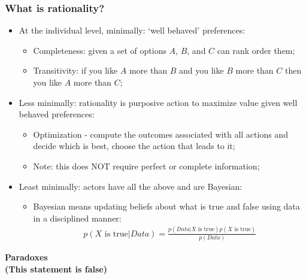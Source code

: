 \documentclass[aspectratio=169]{beamer}
\theoremstyle{principle}
\begin{document}
\begin{frame}
\frametitle{What is rationality?}

\begin{itemize}
\item At the individual level, minimally: `well behaved' preferences:
\begin{itemize}
\item Completeness: given a set of options $A$, $B$, and $C$ can rank order them;
\item Transitivity: if you like $A$ more than $B$ and you like $B$ more than $C$ then you like $A$ more than $C$;
\end{itemize}
\bigskip
\item Less minimally: rationality is purposive action to maximize value given well behaved preferences:
\begin{itemize}
\item Optimization - compute the outcomes associated with all actions and decide which is best, choose the action that leads to it;
\item Note: this does NOT require perfect or complete information;
\end{itemize}
\bigskip
\item Least minimally: actors have all the above and are Bayesian:
\begin{itemize}
\item Bayesian means updating beliefs about what is true and false using data in a disciplined manner:
\begin{align*}
p(X\mbox{ is true}|Data) = \frac{p(Data|X\mbox{ is true})p(X\mbox{ is true})}{p(Data)}
\end{align*}
\end{itemize}
\end{itemize} 

\end{frame}

\begin{frame}
\begin{center}
\Huge \textbf{Paradoxes\\
(This statement is false)}
\end{center}
\end{frame}
\end{document}
